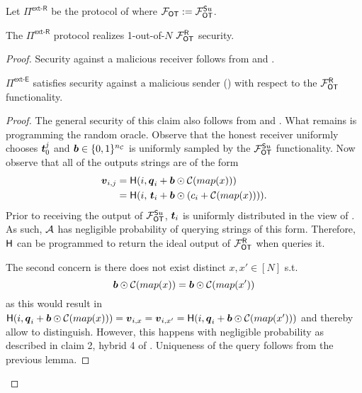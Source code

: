 \begin{definition}\label{def:ext_Su_R}
	Let $\Pi^{\textsf{ext-R}}$ be the protocol of  where $\OOT:=\OOT^{\send u}$.
\end{definition}
\begin{lemma}\label{lem:ext_Su_R}
	The $\Pi^{\textsf{ext-R}}$ protocol realizes 1-out-of-$N$ $\OOT^\rec$ security.
\end{lemma}
\begin{proof}
	Security against a malicious receiver follows from  and . 
	
	
	\begin{claim}\label{claim:ext-Su-MalSender}
		$\Pi^\textsf{ext-E}$ satisfies security against a malicious sender () with respect to the $\OOT^\rec$ functionality.
	\end{claim}
	\begin{proof}
		The general security of this claim also follows from  and . What remains is programming the random oracle. Observe that the honest receiver uniformly chooses $\tt_0^j$ and $\bb\in\{0,1\}^\nc$ is uniformly sampled by the $\OOT^{\send u}$ functionality. Now observe that all of the outputs strings are of the form
		\begin{align*}
			\vv_{i,j}&=\H(i,\qq_i + \bb \odot \mathcal{C}(map(x)))\\
					 &=\H(i,\, \tt_i + \bb \odot (c_i + \mathcal{C}(map(x)))).
		\end{align*}
		Prior to receiving the output of $\OOT^{\send u}$, $\tt_i$ is uniformly distributed in the view of \Adv. As such, $\Adv$ has negligible probability of querying strings of this form. Therefore, $\H$ can be programmed to return the ideal output of $\OOT^\rec$ when \Adv queries it.		
		\iffullversion
		
		The second concern is there does not exist distinct $x,x'\in[N]$ s.t. 
		$$
			\bb \odot \mathcal{C}(map(x)) = \bb \odot \mathcal{C}(map(x'))
		$$
		as this would result in $\H(i,\qq_i + \bb \odot \mathcal{C}(map(x)))=\vv_{i,x}=\vv_{i,x'}=\H(i,\qq_i + \bb \odot \mathcal{C}(map(x')))$ and thereby allow \Adv to distinguish. However, this happens with negligible probability as described in claim 2, hybrid 4 of .
		\else
			Uniqueness of the query follows from the previous lemma.
		\fi
		\pe
	\end{proof}
\iffullversion \else
\vspace{-0.4cm}
\fi
\pe
\end{proof}




